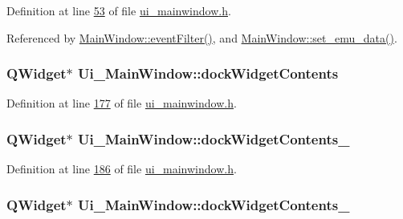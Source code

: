 Definition at line \hyperlink{a00139_source_l00053}{53} of file \hyperlink{a00139_source}{ui\+\_\+mainwindow.\+h}.



Referenced by \hyperlink{a00109_source_l00100}{Main\+Window\+::event\+Filter()}, and \hyperlink{a00134_source_l00606}{Main\+Window\+::set\+\_\+emu\+\_\+data()}.

\hypertarget{a00080_a765ded8236736213d556f6f91941808e}{
\subsubsection[{dock\+Widget\+Contents}]{\setlength{\rightskip}{0pt plus 5cm}Q\+Widget$\ast$ Ui\+\_\+\+Main\+Window\+::dock\+Widget\+Contents}}\label{a00080_a765ded8236736213d556f6f91941808e}


Definition at line \hyperlink{a00139_source_l00177}{177} of file \hyperlink{a00139_source}{ui\+\_\+mainwindow.\+h}.

\hypertarget{a00080_aee633ff4cf1f7b57d7490ac2abf023de}{
\subsubsection[{dock\+Widget\+Contents\+\_\+27}]{\setlength{\rightskip}{0pt plus 5cm}Q\+Widget$\ast$ Ui\+\_\+\+Main\+Window\+::dock\+Widget\+Contents\+\_}}\label{a00080_aee633ff4cf1f7b57d7490ac2abf023de}


Definition at line \hyperlink{a00139_source_l00186}{186} of file \hyperlink{a00139_source}{ui\+\_\+mainwindow.\+h}.

\hypertarget{a00080_a23b450a9debad2b0fecc6f063772caf2}{
\subsubsection[{dock\+Widget\+Contents\+\_\+6}]{\setlength{\rightskip}{0pt plus 5cm}Q\+Widget$\ast$ Ui\+\_\+\+Main\+Window\+::dock\+Widget\+Contents\+\_}}\label{a00080_a23b450a9debad2b0fecc6f063772caf2}



